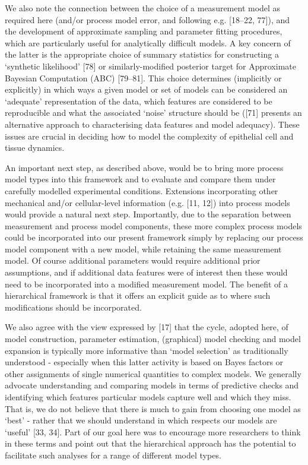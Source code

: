 \documentclass[10pt,letterpaper]{article}
\begin{document}
We also note the connection between the choice of a measurement model as
required here (and/or process model error, and following e.g. {[}18--22,
77{]}), and the development of approximate sampling and parameter
fitting procedures, which are particularly useful for analytically
difficult models. A key concern of the latter is the appropriate choice
of summary statistics for constructing a `synthetic likelihood' {[}78{]}
or similarly-modified posterior target for Approximate Bayesian
Computation (ABC) {[}79--81{]}. This choice determines (implicitly or
explicitly) in which ways a given model or set of models can be
considered an `adequate' representation of the data, which features are
considered to be reproducible and what the associated `noise' structure
should be ({[}71{]} presents an alternative approach to characterising
data features and model adequacy). These issues are crucial in deciding
how to model the complexity of epithelial cell and tissue dynamics.

An important next step, as described above, would be to bring more
process model types into this framework and to evaluate and compare them
under carefully modelled experimental conditions. Extensions
incorporating other mechanical and/or cellular-level information (e.g.
{[}11, 12{]}) into process models would provide a natural next step.
Importantly, due to the separation between measurement and process model
components, these more complex process models could be incorporated into
our present framework simply by replacing our process model component
with a new model, while retaining the same measurement model. Of course
additional parameters would require additional prior assumptions, and if
additional data features were of interest then these would need to be
incorporated into a modified measurement model. The benefit of a
hierarchical framework is that it offers an explicit guide as to where
such modifications should be incorporated.

We also agree with the view expressed by {[}17{]} that the cycle,
adopted here, of model construction, parameter estimation, (graphical)
model checking and model expansion is typically more informative than
`model selection' as traditionally understood - especially when this
latter activity is based on Bayes factors or other assignments of single
numerical quantities to complex models. We generally advocate
understanding and comparing models in terms of predictive checks and
identifying which features particular models capture well and which they
miss. That is, we do not believe that there is much to gain from
choosing one model as `best' - rather that we should understand in which
respects our models are `useful' {[}33, 34{]}. Part of our goal here was
to encourage more researchers to think in these terms and point out that
the hierarchical approach has the potential to facilitate such analyses
for a range of different model types.
\end{document}

